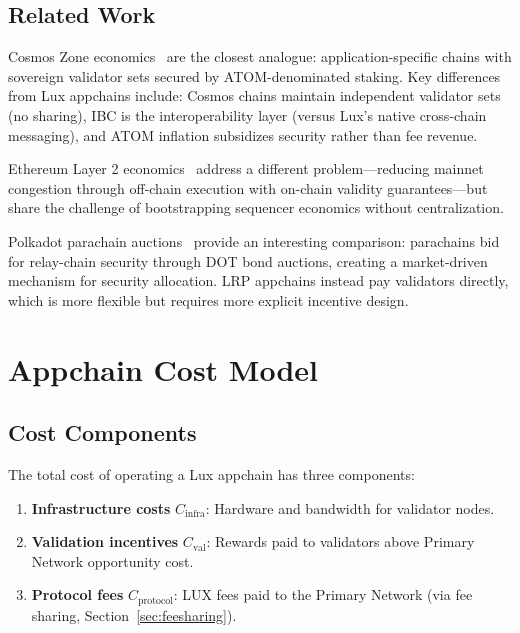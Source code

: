 \documentclass[11pt]{article}
\begin{document}
\subsection{Related Work}

Cosmos Zone economics~\cite{kwon2016cosmos} are the closest analogue: application-specific
chains with sovereign validator sets secured by ATOM-denominated staking. Key differences
from Lux appchains include: Cosmos chains maintain independent validator sets (no sharing),
IBC is the interoperability layer (versus Lux's native cross-chain messaging), and ATOM
inflation subsidizes security rather than fee revenue.

Ethereum Layer 2 economics~\cite{konstantopoulos2021optimism} address a different
problem---reducing mainnet congestion through off-chain execution with on-chain validity
guarantees---but share the challenge of bootstrapping sequencer economics without
centralization.

Polkadot parachain auctions~\cite{wood2016polkadot} provide an interesting comparison:
parachains bid for relay-chain security through DOT bond auctions, creating a market-driven
mechanism for security allocation. LRP appchains instead pay validators directly, which is
more flexible but requires more explicit incentive design.

\section{Appchain Cost Model}
\label{sec:costs}

\subsection{Cost Components}

The total cost of operating a Lux appchain has three components:

\begin{enumerate}[leftmargin=1.5em]
  \item \textbf{Infrastructure costs} $C_{\text{infra}}$: Hardware and bandwidth for
    validator nodes.
  \item \textbf{Validation incentives} $C_{\text{val}}$: Rewards paid to validators
    above Primary Network opportunity cost.
  \item \textbf{Protocol fees} $C_{\text{protocol}}$: LUX fees paid to the Primary Network
    (via fee sharing, Section~\ref{sec:feesharing}).
\end{enumerate}
\end{document}
